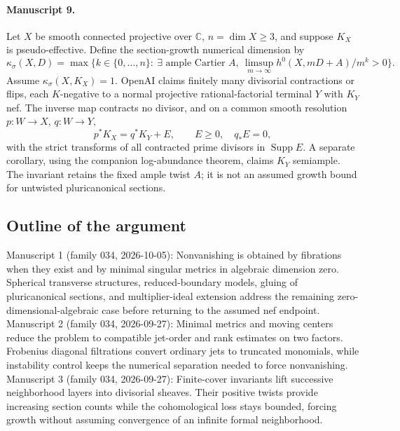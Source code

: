 \documentclass[11pt]{article}
\begin{document}
\paragraph{Manuscript 9.}
Let $X$ be smooth connected projective over $\mathbb C$, $n=\dim X\ge3$, and suppose $K_X$ is pseudo-effective. Define the section-growth numerical dimension by
\[
\kappa_\sigma(X,D)=\max\{k\in\{0,\ldots,n\}:\ \exists\text{ ample Cartier }A,\ \limsup_{m\to\infty}h^0(X,mD+A)/m^k>0\}.
\]
Assume $\kappa_\sigma(X,K_X)=1$. OpenAI claims finitely many divisorial contractions or flips, each $K$-negative to a normal projective rational-factorial terminal $Y$ with $K_Y$ nef. The inverse map contracts no divisor, and on a common smooth resolution $p:W\to X$, $q:W\to Y$,
\[
p^*K_X=q^*K_Y+E,\qquad E\ge0,\quad q_*E=0,
\]
with the strict transforms of all contracted prime divisors in $\operatorname{Supp}E$. A separate corollary, using the companion log-abundance theorem, claims $K_Y$ semiample. The invariant retains the fixed ample twist $A$; it is not an assumed growth bound for untwisted pluricanonical sections.

\subsection{Outline of the argument}
Manuscript 1 (family 034, 2026-10-05): Nonvanishing is obtained by fibrations when they exist and by minimal singular metrics in algebraic dimension zero. Spherical transverse structures, reduced-boundary models, gluing of pluricanonical sections, and multiplier-ideal extension address the remaining zero-dimensional-algebraic case before returning to the assumed nef endpoint. Manuscript 2 (family 034, 2026-09-27): Minimal metrics and moving centers reduce the problem to compatible jet-order and rank estimates on two factors. Frobenius diagonal filtrations convert ordinary jets to truncated monomials, while instability control keeps the numerical separation needed to force nonvanishing. Manuscript 3 (family 034, 2026-09-27): Finite-cover invariants lift successive neighborhood layers into divisorial sheaves. Their positive twists provide increasing section counts while the cohomological loss stays bounded, forcing growth without assuming convergence of an infinite formal neighborhood.
\end{document}
